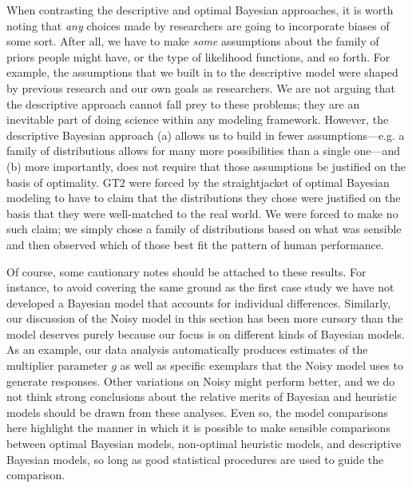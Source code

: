 When contrasting the descriptive and optimal Bayesian approaches, it is worth noting that {\it any} choices made by researchers are going to incorporate biases of some sort. After all, we have to make {\it some} assumptions about the family of priors people might have, or the type of likelihood functions, and so forth. For example, the assumptions that we built in to the descriptive model were shaped by previous research and our own goals as researchers. We are not arguing that the descriptive approach cannot fall prey to these problems; they are an inevitable part of doing science within any modeling framework.  However, the descriptive Bayesian approach (a) allows us to build in fewer assumptions---e.g. a family of distributions allows for many more possibilities than a single one---and (b) more importantly, does not require that those assumptions be justified on the basis of optimality. GT2 were forced by the straightjacket of optimal Bayesian modeling to have to claim that the distributions they chose were justified on the basis that they were well-matched to the real world. We were forced to make no such claim; we simply chose a family of distributions based on what was sensible and then observed which of those best fit the pattern of human performance.

Of course, some cautionary notes should be attached to these results. For instance, to avoid covering the same ground as the first case study we have not developed a Bayesian model that accounts for individual differences. Similarly, our discussion of the Noisy \mink model in this section has been more cursory than the model deserves purely because our focus is on different kinds of Bayesian models. As an example, our data analysis automatically produces estimates of the multiplier parameter $g$ as well as specific exemplars that the Noisy \mink model uses to generate responses. Other variations on Noisy \mink might perform better, and we do not think strong conclusions about the relative merits of Bayesian and heuristic models should be drawn from these analyses. Even so, the model comparisons here highlight the manner in which it is possible to make sensible comparisons between optimal Bayesian models, non-optimal heuristic models, and descriptive Bayesian models, so long as good statistical procedures are used to guide the comparison.




